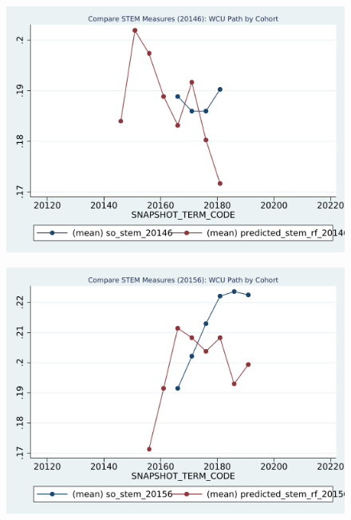 \begin{figure}[h!]
\begin{centering}
\includegraphics[scale=1]{"figures/WCU_20146_COMPARE_path_by_cohort_CAREER_STEM"}
\end{centering}
\end{figure}
\newpage
\begin{figure}[h!]
\begin{centering}
\includegraphics[scale=1]{"figures/WCU_20156_COMPARE_path_by_cohort_CAREER_STEM"}
\end{centering}
\end{figure}
\newpage
